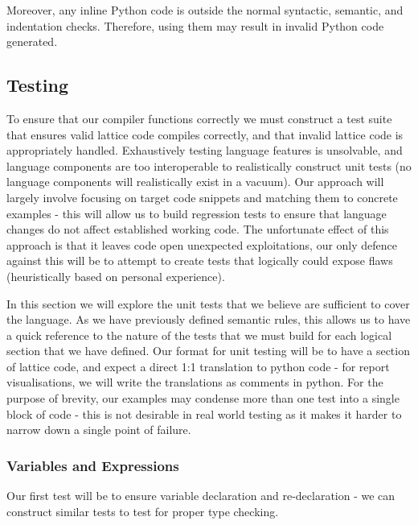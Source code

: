Moreover, any inline Python code is outside the normal syntactic, semantic, and indentation checks.
Therefore, using them may result in invalid Python code generated.
\subsection{Testing}
To ensure that our compiler functions correctly we must construct a test suite that ensures valid lattice code compiles
correctly, and that invalid lattice code is appropriately handled.
Exhaustively testing language features is unsolvable, and language components are too interoperable to realistically
construct unit tests (no language components will realistically exist in a vacuum).
Our approach will largely involve focusing on target code snippets and matching them to concrete examples - this will
allow us to build regression tests to ensure that language changes do not affect established working code.
The unfortunate effect of this approach is that it leaves code open unexpected exploitations, our only defence against
this will be to attempt to create tests that logically could expose flaws (heuristically based on personal experience).

In this section we will explore the unit tests that we believe are sufficient to cover the language.
As we have previously defined semantic rules, this allows us to have a quick reference to the nature of the tests that
we must build for each logical section that we have defined.
Our format for unit testing will be to have a section of lattice code, and expect a direct 1:1 translation to
python code - for report visualisations, we will write the translations as comments in python.
For the purpose of brevity, our examples may condense more than one test into a single block of code - this is not
desirable in real world testing as it makes it harder to narrow down a single point of failure.

\subsubsection{Variables and Expressions}
Our first test will be to ensure variable declaration and re-declaration - we can construct similar tests to test for
proper type checking.

